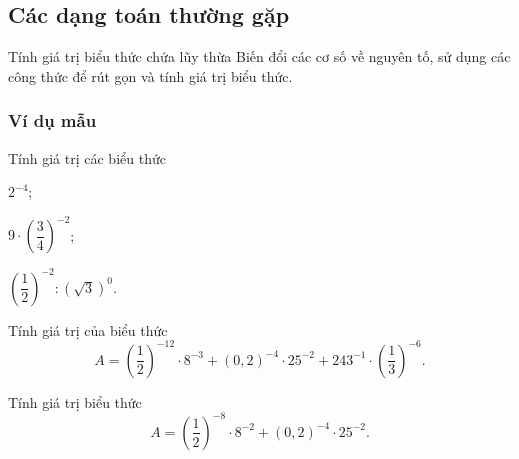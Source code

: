 \subsection{Các dạng toán thường gặp}
\begin{dang}{Tính giá trị biểu thức chứa lũy thừa}
	Biến đổi các cơ số về nguyên tố, sử dụng các công thức để rút gọn và tính giá trị biểu thức.
\end{dang}
\subsubsection{Ví dụ mẫu}
\begin{vd} 
	Tính giá trị các biểu thức
	\begin{listEX}[3]
		\item $2^{-4}$;
		\item $9\cdot \left(\dfrac{3}{4}\right)^{-2}$;
		\item $\left(\dfrac{1}{2}\right)^{-2}:\left(\sqrt{3}\right)^0$.
	\end{listEX}
\end{vd}
\begin{vd} 
	Tính giá trị của biểu thức $$A=\left(\dfrac{1}{2}\right)^{-12}\cdot 8^{-3}+(0{,}2)^{-4}\cdot 25^{-2}+243^{-1}\cdot \left(\dfrac{1}{3}\right)^{-6}.$$
\end{vd}
\begin{vd} 
	Tính giá trị biểu thức $$A=\left(\dfrac{1}{2}\right)^{-8}\cdot 8^{-2}+(0{,}2)^{-4}\cdot 25^{-2}.$$
\end{vd}
